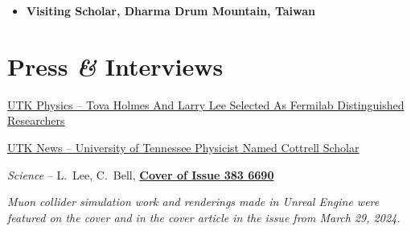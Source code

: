 \documentclass[11pt,letterpaper]{article}
\begin{document}
\begin{itemize}
  \item \textbf{Visiting Scholar, Dharma Drum Mountain, Taiwan}


  \end{itemize}


\section*{Press \textit{\&} Interviews}

      \begin{itemizetighter}

      \item \href{https://physics.utk.edu/tova-holmes-and-larry-lee-selected-as-fermilab-distinguished-researchers/}{UTK Physics -- Tova Holmes And Larry Lee Selected As Fermilab Distinguished Researchers}

      \item \href{https://news.utk.edu/2025/02/12/university-of-tennessee-physicist-named-cottrell-scholar/}{UTK News -- University of Tennessee Physicist Named Cottrell Scholar}

      \item \emph{Science} -- L.~Lee, C.~Bell, \textbf{\href{https://www.science.org/toc/science/383/6690}{Cover of Issue 383 6690}}  


      \begin{itemizetightrightpad}
        \item \emph{Muon collider simulation work and renderings made in Unreal Engine were featured on the cover and in the cover article in the issue from March 29, 2024.}
      \end{itemizetightrightpad}


\end{itemizetighter}
\end{document}
